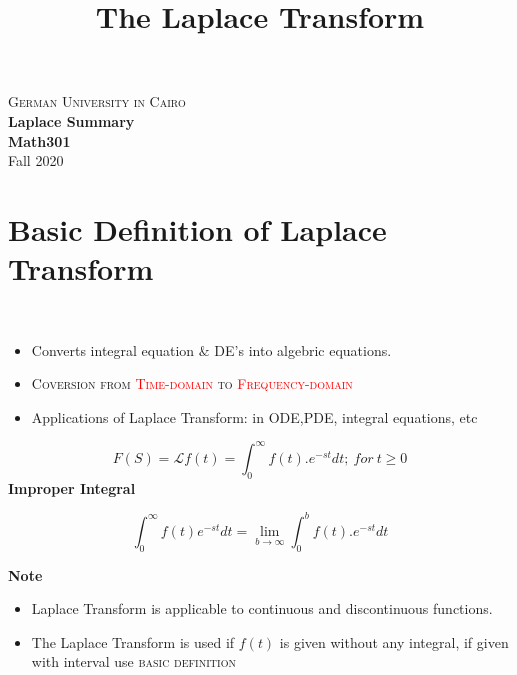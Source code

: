 \documentclass[11pt]{article}
\title{The Laplace Transform}
\theoremstyle{definition}
\newcommand{\bb}{\mathcal{L}}
\begin{document}
\thispagestyle{empty}
\begin{center}
    \textsc{\LARGE German University in Cairo}\\[1.0cm]
    {\LARGE \bf Laplace Summary}\\ [0.5cm]
    {\large \bf Math301}\\ [0.5cm]
    Fall 2020
\end{center}
\tableofcontents

\section{Basic Definition of Laplace Transform}
\\
\begin{itemize}
    \item Converts integral equation $\&$ DE's into algebric equations.
    \item  \textsc{Coversion from \textcolor{red}{Time-domain} to \textcolor{red}{Frequency-domain}}
    \item Applications of Laplace Transform: in ODE,PDE, integral equations, etc \dotsc    
\end{itemize}        
\begin{equation}
    F(S) = \bb{f(t)} = \int_0^\infty f(t).e^{-st}dt; \ for\  t\geq0
\end{equation}
\textbf{Improper Integral}

\begin{equation}
    \int_0^\infty f(t)e^{-st} dt = \displaystyle{\lim_{b \to \infty}} \int_0^b f(t).e^{-st} dt
\end{equation}    

\textbf{Note} \\ 

\begin{itemize}
    \item Laplace Transform is applicable to continuous and discontinuous functions.
    \item The Laplace Transform is used if $f(t)$ is given without any integral, if given with interval use \textsc{basic definition}
\end{itemize}
\end{document}
